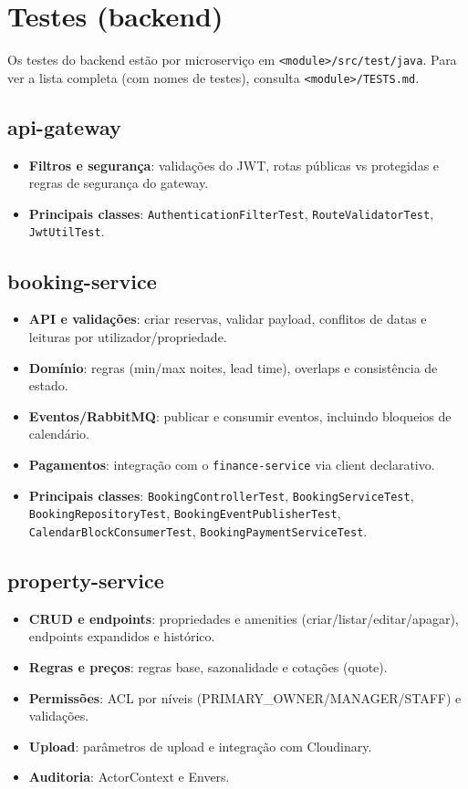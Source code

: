\newpage
\section{Testes (backend)}
Os testes do backend estão por microserviço em \texttt{<module>/src/test/java}. Para ver a lista completa (com nomes de testes), consulta \texttt{<module>/TESTS.md}.

\subsection{api-gateway}
\begin{itemize}[nosep]
  \item \textbf{Filtros e segurança}: validações do JWT, rotas públicas vs protegidas e regras de segurança do gateway.
  \item \textbf{Principais classes}: \texttt{AuthenticationFilterTest}, \texttt{RouteValidatorTest}, \texttt{JwtUtilTest}.
\end{itemize}

\subsection{booking-service}
\begin{itemize}[nosep]
  \item \textbf{API e validações}: criar reservas, validar payload, conflitos de datas e leituras por utilizador/propriedade.
  \item \textbf{Domínio}: regras (min/max noites, lead time), overlaps e consistência de estado.
  \item \textbf{Eventos/RabbitMQ}: publicar e consumir eventos, incluindo bloqueios de calendário.
  \item \textbf{Pagamentos}: integração com o \texttt{finance-service} via client declarativo.
  \item \textbf{Principais classes}: \texttt{BookingControllerTest}, \texttt{BookingServiceTest}, \texttt{BookingRepositoryTest}, \texttt{BookingEventPublisherTest}, \texttt{CalendarBlockConsumerTest}, \texttt{BookingPaymentServiceTest}.
\end{itemize}

\subsection{property-service}
\begin{itemize}[nosep]
  \item \textbf{CRUD e endpoints}: propriedades e amenities (criar/listar/editar/apagar), endpoints expandidos e histórico.
  \item \textbf{Regras e preços}: regras base, sazonalidade e cotações (quote).
  \item \textbf{Permissões}: ACL por níveis (PRIMARY\_OWNER/MANAGER/STAFF) e validações.
  \item \textbf{Upload}: parâmetros de upload e integração com Cloudinary.
  \item \textbf{Auditoria}: ActorContext e Envers.
\end{itemize}

